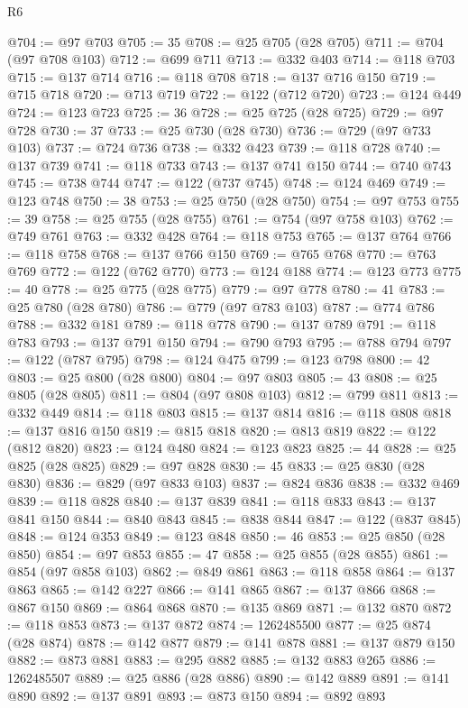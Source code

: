 \begin{lexlean}{R6}
\begin{coremodule}
@704 := @97 @703
@705 := 35
@708 := @25 @705 (@28 @705)
@711 := @704 (@97 @708 @103)
@712 := @699 @711
@713 := @332 @403
@714 := @118 @703
@715 := @137 @714
@716 := @118 @708
@718 := @137 @716 @150
@719 := @715 @718
@720 := @713 @719
@722 := @122 (@712 @720)
@723 := @124 @449
@724 := @123 @723
@725 := 36
@728 := @25 @725 (@28 @725)
@729 := @97 @728
@730 := 37
@733 := @25 @730 (@28 @730)
@736 := @729 (@97 @733 @103)
@737 := @724 @736
@738 := @332 @423
@739 := @118 @728
@740 := @137 @739
@741 := @118 @733
@743 := @137 @741 @150
@744 := @740 @743
@745 := @738 @744
@747 := @122 (@737 @745)
@748 := @124 @469
@749 := @123 @748
@750 := 38
@753 := @25 @750 (@28 @750)
@754 := @97 @753
@755 := 39
@758 := @25 @755 (@28 @755)
@761 := @754 (@97 @758 @103)
@762 := @749 @761
@763 := @332 @428
@764 := @118 @753
@765 := @137 @764
@766 := @118 @758
@768 := @137 @766 @150
@769 := @765 @768
@770 := @763 @769
@772 := @122 (@762 @770)
@773 := @124 @188
@774 := @123 @773
@775 := 40
@778 := @25 @775 (@28 @775)
@779 := @97 @778
@780 := 41
@783 := @25 @780 (@28 @780)
@786 := @779 (@97 @783 @103)
@787 := @774 @786
@788 := @332 @181
@789 := @118 @778
@790 := @137 @789
@791 := @118 @783
@793 := @137 @791 @150
@794 := @790 @793
@795 := @788 @794
@797 := @122 (@787 @795)
@798 := @124 @475
@799 := @123 @798
@800 := 42
@803 := @25 @800 (@28 @800)
@804 := @97 @803
@805 := 43
@808 := @25 @805 (@28 @805)
@811 := @804 (@97 @808 @103)
@812 := @799 @811
@813 := @332 @449
@814 := @118 @803
@815 := @137 @814
@816 := @118 @808
@818 := @137 @816 @150
@819 := @815 @818
@820 := @813 @819
@822 := @122 (@812 @820)
@823 := @124 @480
@824 := @123 @823
@825 := 44
@828 := @25 @825 (@28 @825)
@829 := @97 @828
@830 := 45
@833 := @25 @830 (@28 @830)
@836 := @829 (@97 @833 @103)
@837 := @824 @836
@838 := @332 @469
@839 := @118 @828
@840 := @137 @839
@841 := @118 @833
@843 := @137 @841 @150
@844 := @840 @843
@845 := @838 @844
@847 := @122 (@837 @845)
@848 := @124 @353
@849 := @123 @848
@850 := 46
@853 := @25 @850 (@28 @850)
@854 := @97 @853
@855 := 47
@858 := @25 @855 (@28 @855)
@861 := @854 (@97 @858 @103)
@862 := @849 @861
@863 := @118 @858
@864 := @137 @863
@865 := @142 @227
@866 := @141 @865
@867 := @137 @866
@868 := @867 @150
@869 := @864 @868
@870 := @135 @869
@871 := @132 @870
@872 := @118 @853
@873 := @137 @872
@874 := 1262485500
@877 := @25 @874 (@28 @874)
@878 := @142 @877
@879 := @141 @878
@881 := @137 @879 @150
@882 := @873 @881
@883 := @295 @882
@885 := @132 @883 @265
@886 := 1262485507
@889 := @25 @886 (@28 @886)
@890 := @142 @889
@891 := @141 @890
@892 := @137 @891
@893 := @873 @150
@894 := @892 @893

\end{coremodule}
\end{lexlean}
